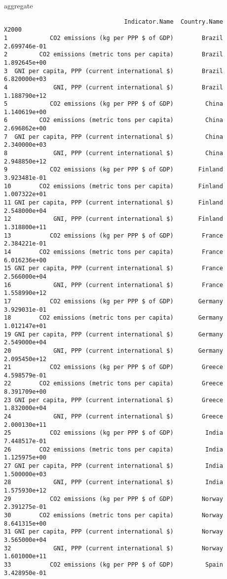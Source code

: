 \documentclass[xcolor={usenames,svgnames,dvipsnames}]{beamer}
\begin{document}
\begin{frame}[fragile,label=sec-3-7]{aggregate}
\begin{verbatim}
                                  Indicator.Name  Country.Name        X2000
1            CO2 emissions (kg per PPP $ of GDP)        Brazil 2.699746e-01
2         CO2 emissions (metric tons per capita)        Brazil 1.892645e+00
3  GNI per capita, PPP (current international $)        Brazil 6.820000e+03
4             GNI, PPP (current international $)        Brazil 1.188790e+12
5            CO2 emissions (kg per PPP $ of GDP)         China 1.140619e+00
6         CO2 emissions (metric tons per capita)         China 2.696862e+00
7  GNI per capita, PPP (current international $)         China 2.340000e+03
8             GNI, PPP (current international $)         China 2.948850e+12
9            CO2 emissions (kg per PPP $ of GDP)       Finland 3.923481e-01
10        CO2 emissions (metric tons per capita)       Finland 1.007322e+01
11 GNI per capita, PPP (current international $)       Finland 2.548000e+04
12            GNI, PPP (current international $)       Finland 1.318800e+11
13           CO2 emissions (kg per PPP $ of GDP)        France 2.384221e-01
14        CO2 emissions (metric tons per capita)        France 6.016236e+00
15 GNI per capita, PPP (current international $)        France 2.566000e+04
16            GNI, PPP (current international $)        France 1.558990e+12
17           CO2 emissions (kg per PPP $ of GDP)       Germany 3.929031e-01
18        CO2 emissions (metric tons per capita)       Germany 1.012147e+01
19 GNI per capita, PPP (current international $)       Germany 2.549000e+04
20            GNI, PPP (current international $)       Germany 2.095450e+12
21           CO2 emissions (kg per PPP $ of GDP)        Greece 4.598579e-01
22        CO2 emissions (metric tons per capita)        Greece 8.391709e+00
23 GNI per capita, PPP (current international $)        Greece 1.832000e+04
24            GNI, PPP (current international $)        Greece 2.000130e+11
25           CO2 emissions (kg per PPP $ of GDP)         India 7.448517e-01
26        CO2 emissions (metric tons per capita)         India 1.125975e+00
27 GNI per capita, PPP (current international $)         India 1.500000e+03
28            GNI, PPP (current international $)         India 1.575930e+12
29           CO2 emissions (kg per PPP $ of GDP)        Norway 2.391275e-01
30        CO2 emissions (metric tons per capita)        Norway 8.641315e+00
31 GNI per capita, PPP (current international $)        Norway 3.565000e+04
32            GNI, PPP (current international $)        Norway 1.601000e+11
33           CO2 emissions (kg per PPP $ of GDP)         Spain 3.428950e-01

\end{verbatim}
\end{frame}
\end{document}
